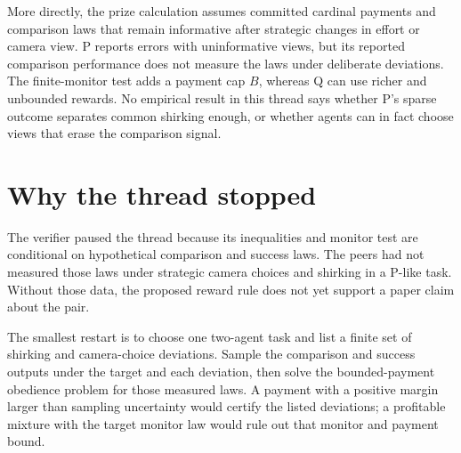 \documentclass{article}
\begin{document}
More directly, the prize calculation assumes committed cardinal payments and comparison laws that remain informative
after strategic changes in effort or camera view. P reports errors with uninformative views, but its reported
comparison performance does not measure the laws under deliberate deviations. The finite-monitor test adds a payment
cap \(B\), whereas Q can use richer and unbounded rewards. No empirical result in this thread says whether P's sparse
outcome separates common shirking enough, or whether agents can in fact choose views that erase the comparison signal.

\section{Why the thread stopped}

The verifier paused the thread because its inequalities and monitor test are conditional on hypothetical comparison
and success laws. The peers had not measured those laws under strategic camera choices and shirking in a P-like task.
Without those data, the proposed reward rule does not yet support a paper claim about the pair.

The smallest restart is to choose one two-agent task and list a finite set of shirking and camera-choice deviations.
Sample the comparison and success outputs under the target and each deviation, then solve the bounded-payment
obedience problem for those measured laws. A payment with a positive margin larger than sampling uncertainty would
certify the listed deviations; a profitable mixture with the target monitor law would rule out that monitor and
payment bound.



\end{document}
